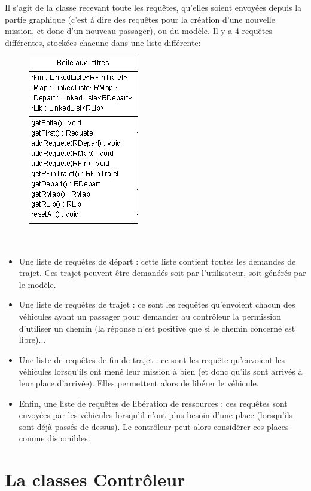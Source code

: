 \documentclass[a4paper, titlepage]{report}
\begin{document}
      Il s'agit de la classe recevant toute les requêtes, qu'elles soient envoyées depuis la partie graphique (c'est à dire des requêtes pour la création d'une nouvelle mission, et donc d'un nouveau passager), ou du modèle. Il y a 4 requêtes différentes, stockées chacune dans une liste différente:
      \begin{figure}
\includegraphics[scale=1]{Images/boite.png}
\end{figure} \\  
      \begin{itemize}
      \item Une liste de requêtes de départ : cette liste contient toutes les demandes de trajet. Ces trajet peuvent être demandés soit par l'utilisateur, soit générés par le modèle.
      \item Une liste de requêtes de trajet : ce sont les requêtes qu'envoient chacun des véhicules ayant un passager pour demander au contrôleur la permission d'utiliser un chemin (la réponse n'est positive que si le chemin concerné est libre)...
      \item Une liste de requêtes de fin de trajet : ce sont les requête qu'envoient les véhicules lorsqu'ils ont mené leur mission à bien (et donc qu'ils sont arrivés à leur place d'arrivée). Elles permettent alors de libérer le véhicule.
      \item Enfin, une liste de requêtes de libération de ressources : ces requêtes sont envoyées par les véhicules lorsqu'il n'ont plus besoin d'une place (lorsqu'ils sont déjà passés de dessus). Le contrôleur peut alors considérer ces places comme disponibles.
      \end{itemize}

\vspace{1cm}
\hspace{-1cm}\section{La classes Contrôleur}
\end{document}
